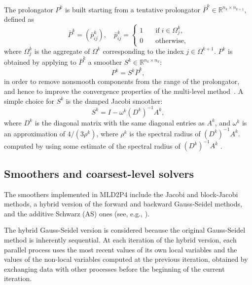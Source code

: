 The prolongator $P^k$ is built starting from a tentative prolongator
$\bar{P}^k \in \mathbb{R}^{n_k \times n_{k+1}}$, defined as
$$
\bar{P}^k =(\bar{p}_{ij}^k), \quad  \bar{p}_{ij}^k = 
\left\{ \begin{array}{ll}
1 & \quad \mbox{if} \; i \in \Omega^k_j, \\
0 & \quad \mbox{otherwise},
\end{array} \right.
\label{eq:tent_prol}
$$
where $\Omega^k_j$ is the aggregate of $\Omega^k$
corresponding to the index $j \in \Omega^{k+1}$.
$P^k$ is obtained by applying to $\bar{P}^k$ a smoother
$S^k \in \mathbb{R}^{n_k \times n_k}$:
$$
P^k = S^k \bar{P}^k,
$$
in order to remove nonsmooth components from the range of the prolongator,
and hence to improve the convergence properties of the multi-level
method~\cite{BREZINA_VANEK,Stuben_01}.
A simple choice for $S^k$ is the damped Jacobi smoother:
$$
S^k = I - \omega^k (D^k)^{-1} A^k , 
$$
where $D^k$ is the diagonal matrix with the same diagonal entries as $A^k$,
and $\omega^k$ is an approximation of $4/(3\rho^k)$, where
$\rho^k$ is the spectral radius of $(D^k)^{-1}A^k$.
computed by using some estimate of the spectral radius of $(D^k)^{-1}A^k$
\cite{BREZINA_VANEK}.

\subsection{Smoothers and coarsest-level solvers\label{sec:smoothers}}

The smoothers implemented in MLD2P4 include the Jacobi and block-Jacobi methods,
a hybrid version of the forward and backward Gauss-Seidel methods, and the
additive Schwarz (AS) ones (see, e.g., \cite{Saad_book,dd2_96}). 

The hybrid Gauss-Seidel
version is considered because the original Gauss-Seidel method is inherently sequential.
At each iteration of the hybrid version, each parallel process uses the most recent values
of its own local variables and the values of the non-local variables computed at the
previous iteration, obtained by exchanging data with other processes before
the beginning of the current iteration.

